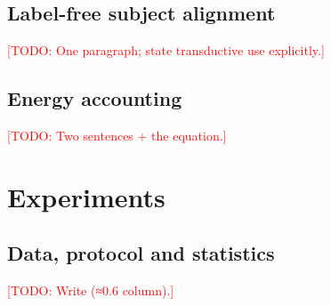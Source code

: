 \documentclass{article}
\newcommand{\todo}[1]{\textcolor{red}{[TODO: #1]}}
\begin{document}
\subsection{Label-free subject alignment}
\label{ssec:alignment}
\todo{One paragraph; state transductive use explicitly.}

\subsection{Energy accounting}
\label{ssec:energy}
\todo{Two sentences + the equation.}

\section{Experiments}
\label{sec:exp}

\subsection{Data, protocol and statistics}
\label{ssec:protocol}
\todo{Write (≈0.6 column).}
\end{document}
